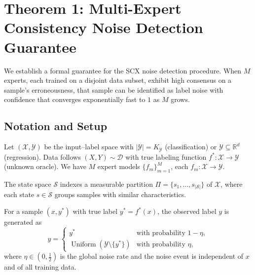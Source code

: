 
\section{Theorem 1: Multi-Expert Consistency Noise Detection Guarantee}
\label{sec:thm1}

We establish a formal guarantee for the SCX noise detection procedure. When $M$
experts, each trained on a disjoint data subset, exhibit high consensus on a
sample's erroneousness, that sample can be identified as label noise with
confidence that converges exponentially fast to $1$ as $M$ grows.

\subsection{Notation and Setup}
\label{sec:thm1:setup}

Let $(\mathcal{X},\mathcal{Y})$ be the input--label space with
$|\mathcal{Y}| = K_{\mathcal{Y}}$ (classification) or
$\mathcal{Y} \subseteq \mathbb{R}^d$ (regression). Data follows
$(X,Y) \sim \mathcal{D}$ with true labeling function
$f^* : \mathcal{X} \to \mathcal{Y}$ (unknown oracle). We have $M$ expert models
$\{f_m\}_{m=1}^M$, each $f_m : \mathcal{X} \to \mathcal{Y}$.

The state space $\mathcal{S}$ indexes a measurable partition
$\Pi = \{s_1,\dots,s_{|\mathcal{S}|}\}$ of $\mathcal{X}$, where each state
$s \in \mathcal{S}$ groups samples with similar characteristics.

\begin{definition}
\label{def:noise-model}
For a sample $(x, y^*)$ with true label $y^* = f^*(x)$, the observed label $y$ is
generated as
\begin{equation}
y = \begin{cases}
y^* & \text{with probability } 1 - \eta, \\[4pt]
\operatorname{Uniform}(\mathcal{Y} \setminus \{y^*\}) & \text{with probability } \eta,
\end{cases}
\label{eq:noise-model}
\end{equation}
where $\eta \in (0, \tfrac12)$ is the global noise rate and the noise event is
independent of $x$ and of all training data.
\end{definition}

